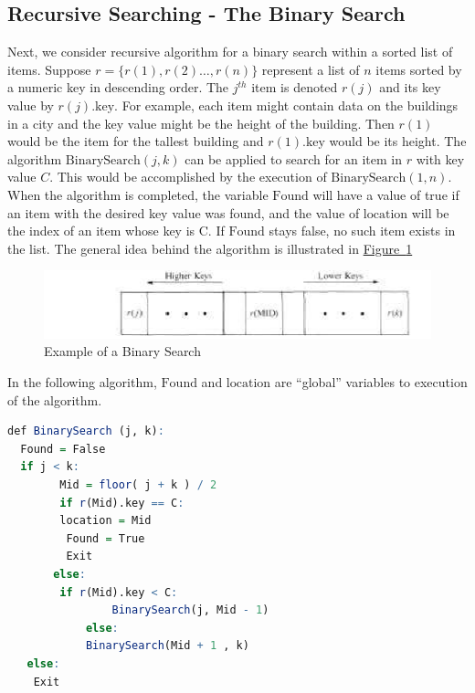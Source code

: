 \documentclass[10pt,]{book}
\theoremstyle{plain}
\theoremstyle{definition}
\theoremstyle{definition}
\theoremstyle{definition}
\theoremstyle{definition}
\numberwithin{equation}{section}
\begin{document}
\subsection[Recursive Searching - The Binary Search]{Recursive Searching - The Binary Search}\label{ss-recursive-searching}
Next, we consider recursive algorithm for a binary search within a sorted list of items.  Suppose  \(r=\{r(1),r(2) \ldots  , r(n)\}\) represent a list of
\(n\) items sorted by a numeric key in descending order. The \(j^{th}\) item is denoted \(r(j)\) and its key value by \(r(j).\textrm{key}\).
For example, each item might contain data on the buildings in a city and the key value might be the height of the building. Then \(r(1)\) would be the item for the tallest building and  \(r(1).\textrm{key}\) would be its height. The algorithm \(\textrm{BinarySearch}(j, k)\) can be applied to search for an item in \(r\) with key value
\(C\). This would be accomplished by the execution of \(\textrm{BinarySearch}(1, n)\). When the algorithm is completed, the variable \(\textrm{Found}\)
will have a value of true if an item with the desired key value was found, and the value of \(\textrm{location}\) will be the index of an item whose key is
C. If \(\textrm{Found}\) stays false, no such item exists in the list. The general idea behind the algorithm is illustrated in \hyperref[fig-binsearch]{Figure~\ref{fig-binsearch}}%
\leavevmode%
\begin{figure}
\centering
\includegraphics[width=1\linewidth]{images/fig-binsearch.png}
\caption{Example of a Binary Search
                \label{fig-binsearch}}
\end{figure}
\par
In the following algorithm, \(\textrm{Found}\) and \(\textrm{location}\) are ``global'' variables to execution of the algorithm.%
\begin{lstlisting}[style=genericinput, language=R]
def BinarySearch (j, k):
  Found = False
  if j < k: 
		Mid = floor( j + k ) / 2
		if r(Mid).key == C: 
	   	location = Mid
         Found = True
         Exit
	   else:
	   	if r(Mid).key < C:
				BinarySearch(j, Mid - 1)
			else: 
         	BinarySearch(Mid + 1 , k)
   else:
   	Exit
\end{lstlisting}
\typeout{************************************************}
\typeout{************************************************}
\end{document}
